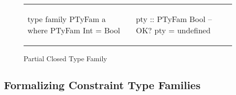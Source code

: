 \documentclass[format=sigplan,manuscript,review,screen,nonacm,margin=1in]{acmart}
\begin{document}
\begin{figure}[ht]
  \begin{tabular}{l l}
    \begin{code}
      type family PTyFam a where
          PTyFam Int = Bool
    \end{code}&%
    \begin{code}
      pty :: PTyFam Bool -- OK?
      pty = undefined
    \end{code}
  \end{tabular}
  \caption{Partial Closed Type Family}
  \label{fig:incomplete-tyfam}
\end{figure}

\subsection{Formalizing Constraint Type Families}\label{subsec:tf-constrained-formal}
\end{document}

